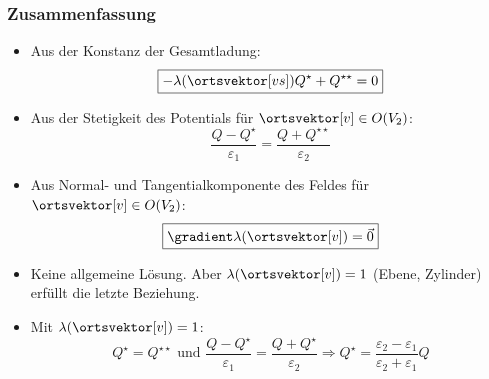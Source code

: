  \begin{frame}
     \frametitle{Zusammenfassung}
     \begin{itemize}[<+->]
     \item Aus der Konstanz der Gesamtladung:
       \begin{equation*}
          \boxed{-\lambda(\ortsvektor[vs])Q^\star+Q^{\star\star}= 0}
       \end{equation*}
      \item Aus der Stetigkeit des Potentials für $\ortsvektor[v]\in O(V_2)$:
        \begin{equation*}
          \boxed{\frac{Q-Q^\star}{\varepsilon_1} = \frac{Q+Q^{\star\star}}{\varepsilon_2}}
       \end{equation*}
     \item Aus Normal- und Tangentialkomponente des Feldes für $\ortsvektor[v]\in O(V_2)$:
       \begin{equation*}
         \boxed{\gradient \lambda(\ortsvektor[v]) = \vec{0}}
       \end{equation*}
     \item Keine allgemeine Lösung. Aber $\lambda (\ortsvektor[v]) = 1$ (Ebene, Zylinder) erfüllt die letzte Beziehung.
     \item Mit $\lambda (\ortsvektor[v]) = 1$:
       \begin{equation*}
         Q^\star = Q^{\star\star} \text{ und } \frac{Q-Q^\star}{\varepsilon_1} = \frac{Q+Q^{\star}}{\varepsilon_2} \Rightarrow \boxed{Q^\star = \frac{\varepsilon_2-\varepsilon_1}{\varepsilon_2+\varepsilon_1} Q}
         \end{equation*}
         
       \end{itemize}
 \end{frame}

